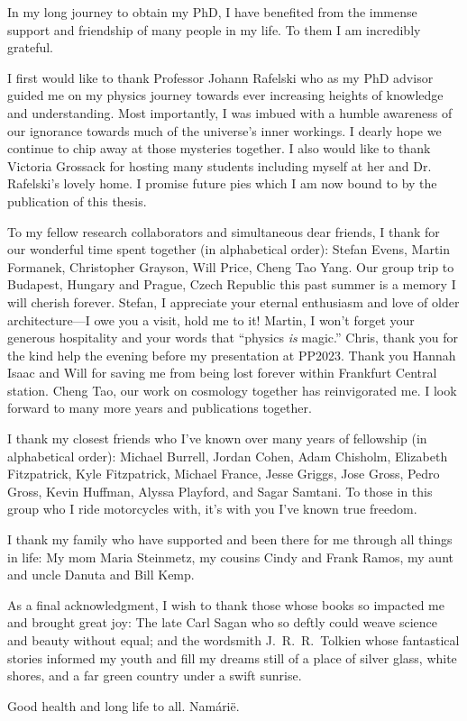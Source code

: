 
In my long journey to obtain my PhD, I have benefited from the immense support and friendship of many people in my life. To them I am incredibly grateful.

I first would like to thank Professor Johann Rafelski who as my PhD advisor guided me on my physics journey towards ever increasing heights of knowledge and understanding. Most importantly, I was imbued with a humble awareness of our ignorance towards much of the universe's inner workings. I dearly hope we continue to chip away at those mysteries together. I also would like to thank Victoria Grossack for hosting many students including myself at her and Dr. Rafelski's lovely home. I promise future pies which I am now bound to by the publication of this thesis.

To my fellow research collaborators and simultaneous dear friends, I thank for our wonderful time spent together (in alphabetical order): Stefan Evens, Martin Formanek, Christopher Grayson, Will Price, Cheng Tao Yang. Our group trip to Budapest, Hungary and Prague, Czech Republic this past summer is a memory I will cherish forever. Stefan, I appreciate your eternal enthusiasm and love of older architecture---I owe you a visit, hold me to it! Martin, I won't forget your generous hospitality and your words that ``physics \emph{is} magic.'' Chris, thank you for the kind help the evening before my presentation at PP2023. Thank you Hannah Isaac and Will for saving me from being lost forever within Frankfurt Central station. Cheng Tao, our work on cosmology together has reinvigorated me. I look forward to many more years and publications together.

I thank my closest friends who I've known over many years of fellowship (in alphabetical order): Michael Burrell, Jordan Cohen, Adam Chisholm, Elizabeth Fitzpatrick, Kyle Fitzpatrick, Michael France, Jesse Griggs, Jose Gross, Pedro Gross, Kevin Huffman, Alyssa Playford, and Sagar Samtani. To those in this group who I ride motorcycles with, it's with you I've known true freedom.

I thank my family who have supported and been there for me through all things in life: My mom Maria Steinmetz, my cousins Cindy and Frank Ramos, my aunt and uncle Danuta and Bill Kemp.

As a final acknowledgment, I wish to thank those whose books so impacted me and brought great joy: The late Carl Sagan who so deftly could weave science and beauty without equal; and the wordsmith J.~R.~R.~Tolkien whose fantastical stories informed my youth and fill my dreams still of a place of silver glass, white shores, and a far green country under a swift sunrise.

Good health and long life to all. Nam\'ari\"e.